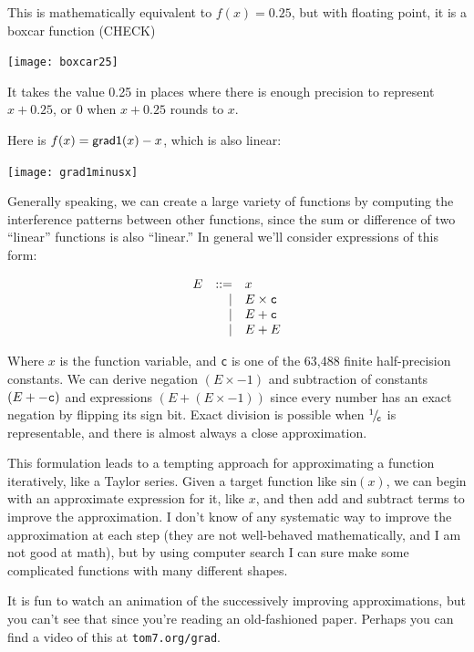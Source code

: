 \documentclass[twocolumn]{article}
\newcommand\sfrac[2]{\!{}\,^{#1}\!/{}\!_{#2}}
\begin{document}
This is mathematically equivalent to $f(x) = 0.25$, but with floating point, it
is a boxcar function (CHECK)

\begin{center}
\texttt{[image: boxcar25]}
\end{center}

It takes the value 0.25 in places where there is enough precision to
represent $x + 0.25$, or 0 when $x + 0.25$ rounds to $x$.

Here is $f(x) = {\sf grad1}(x) - x$, which is also linear:
\begin{center}
\texttt{[image: grad1minusx]}
\end{center}

Generally speaking, we can create a large variety of functions by
computing the interference patterns between other functions, since the
sum or difference of two ``linear'' functions is also ``linear.'' In
general we'll consider expressions of this form:

\[
\begin{array}{rrl}
E & ::= & x              \\
  &  |  & E \times {\tt c}    \\
  &  |  & E + {\tt c}    \\
  &  |  & E + E          \\
\end{array}
\]

Where $x$ is the function variable, and {\tt c} is one of the 63,488
finite half-precision constants. We can derive negation $(E \times -1)$ and
subtraction of constants $(E + -{\tt c})$ and expressions $(E + (E \times
-1))$ since every number has an exact negation by flipping its sign
bit. Exact division is possible when $\sfrac{1}{{\tt c}}$ is
representable, and there is almost always a close approximation.

This formulation leads to a tempting approach for approximating a
function iteratively, like a Taylor series. Given a target function
like $\mathrm{sin}(x)$, we can begin with an approximate expression for it,
like $x$, and then add and subtract terms to improve the
approximation. I don't know of any systematic way to improve the
approximation at each step (they are not well-behaved mathematically,
and I am not good at math), but by using computer search I can sure
make some complicated functions with many different shapes.

It is fun to watch an animation of the successively improving
approximations, but you can't see that since you're reading an
old-fashioned paper. Perhaps you can find a video of this at
\verb+tom7.org/grad+.
\end{document}
